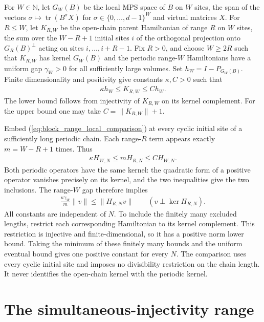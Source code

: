 \documentclass{article}
\begin{document}
For $W\in\mathbb N$, let $G_W(B)$ be the local MPS space of $B$ on $W$ sites, the
span of the vectors $\sigma\mapsto\operatorname{tr}(B^{\sigma}X)$ for
$\sigma\in\{0,\ldots,d-1\}^W$ and virtual matrices $X$. For $R\leq W$, let
$K_{R,W}$ be the open-chain parent Hamiltonian of range $R$ on $W$ sites, the
sum over the $W-R+1$ initial sites $i$ of the orthogonal projection onto
$G_R(B)^\perp$ acting on sites $i,\ldots,i+R-1$.
Fix $R>0$, and choose $W\geq 2R$ such that $K_{R,W}$ has kernel $G_W(B)$ and the periodic range-$W$ Hamiltonians
have a uniform gap $\gamma_W>0$ for all sufficiently large volumes.
Set $h_W=I-P_{G_W(B)}$. Finite dimensionality and positivity give constants
$\kappa,C>0$ such that
\begin{align}
    \kappa h_W\leq K_{R,W}\leq C h_W.
    \label{eq:block_range_local_comparison}
\end{align}
The lower bound follows from injectivity of $K_{R,W}$ on its kernel
complement. For the upper bound one may take
$C=\lVert K_{R,W}\rVert+1$.

Embed (\ref{eq:block_range_local_comparison}) at every cyclic initial site
of a sufficiently long periodic chain. Each range-$R$ term appears
exactly $m=W-R+1$ times. Thus
\begin{align}
    \kappa H_{W,N}\leq mH_{R,N}\leq C H_{W,N}.
    \label{eq:block_range_periodic_comparison}
\end{align}
Both periodic operators have the same kernel: the quadratic form of a
positive operator vanishes precisely on its kernel, and the two inequalities
give the two inclusions. The range-$W$ gap therefore implies
\begin{align}
    \frac{\kappa\gamma_W}{m}\lVert v\rVert
    \leq\lVert H_{R,N}v\rVert
    \qquad(v\perp\ker H_{R,N}).
    \label{eq:block_range_transferred_gap}
\end{align}
All constants are independent of $N$. To include the finitely many excluded
lengths, restrict each corresponding Hamiltonian to its kernel complement.
This restriction is injective and finite-dimensional, so it has a positive
norm lower bound. Taking the minimum of these finitely many bounds and the
uniform eventual bound gives one positive constant for every $N$. The
comparison uses every cyclic
initial site and imposes no divisibility restriction on the chain length.
It never identifies the open-chain kernel with the periodic kernel.

\section{The simultaneous-injectivity range}
\end{document}
